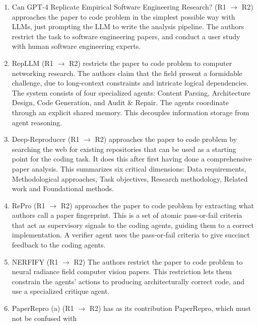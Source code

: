 \documentclass[8pt,a4paper]{article}
\begin{document}
\begin{enumerate}
        The loop terminates when the code reproduces the results in the paper.
    \item Can GPT-4 Replicate Empirical Software Engineering Research?\cite{liang2024} (R1 $\rightarrow$ R2)
        \subitem approaches the paper to code problem in the simplest possible way with LLMs, just prompting the LLM to write the analysis pipeline.
        The authors restrict the task to software engineering papers, and conduct a user study with human software engineering experts.
    \item RepLLM\cite{repllm} (R1 $\rightarrow$ R2)
        \subitem restricts the paper to code problem to computer networking research. 
        The authors claim that the field present a formidable challenge, due to long-context constraints and intricate logical dependencies.
        The system consists of four specialized agents: Content Parsing, Architecture Design, Code Generation, and Audit \& Repair.
        The agents coordinate through an explicit shared memory. This decouples information storage from agent reasoning.
    \item Deep-Reproducer\cite{deepreproducer} (R1 $\rightarrow$ R2)
        \subitem approaches the paper to code problem by searching the web for existing repositories that can be used as a starting point for the coding task. 
        It does this after first having done a comprehensive paper analysis. This summarizes six critical dimensions: 
        Data requirements, Methodological approaches, Task objectives, Research methodology, Related work and Foundational methods.
    \item RePro\cite{zhou2025} (R1 $\rightarrow$ R2)
        \subitem approaches the paper to code problem by extracting what authors call a paper fingerprint. 
        This is a set of atomic pass-or-fail criteria that act as supervisory signals to the coding agents,
        guiding them to a correct implementation. A verifier agent uses the pass-or-fail criteria to give succinct feedback to the coding agents.
    \item NERFIFY\cite{nerfify} (R1 $\rightarrow$ R2)
        \subitem The authors restrict the paper to code problem to neural radiance field computer vision papers. 
        This restriction lets them constrain the agents' actions to producing architecturally correct code, and use a specialized critique agent.
    \item PaperRepro (a)\cite{li2026}\label{itm:li2026desc} (R1 $\rightarrow$ R2)
        \subitem has as its contribution PaperRepro, which must not be confused with 

\end{enumerate}
\end{document}
